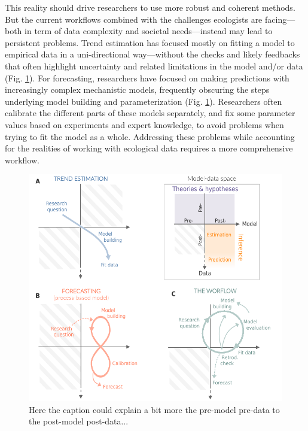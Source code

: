 \documentclass[11pt]{article}
\begin{document}
This reality should drive researchers to use more robust and coherent methods. But the current workflows combined with the challenges ecologists are facing---both in term of data complexity and societal needs---instead may lead to persistent problems. %
Trend estimation has focused mostly on fitting a model to empirical data in a uni-directional way---without the checks and likely feedbacks that often highlight uncertainty and related limitations in the model and/or data (Fig. \ref{fig:modeldata}). For forecasting, researchers have focused on making predictions with increasingly complex mechanistic models, frequently obscuring the steps underlying model building and parameterization (Fig. \ref{fig:modeldata}). Researchers often calibrate the different parts of these models separately, and fix some parameter values based on experiments and expert knowledge, to avoid problems when trying to fit the model as a whole. %
Addressing these problems while accounting for the realities of working with ecological data requires a more comprehensive workflow.

\begin{figure}[h]
	\centering
	\includegraphics{figures/modeldataspaces_rotation}
	\caption{Here the caption could explain a bit more the pre-model pre-data to the post-model post-data...} 
	\label{fig:modeldata}
\end{figure}
\end{document}
